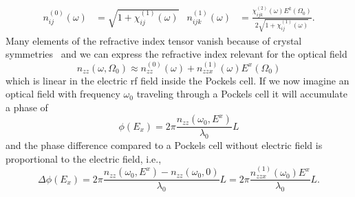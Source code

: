 \begin{align}
	n^{(0)}_{ij}(\omega)
	&=
	\sqrt{1+\chi^{(1)}_{ij}(\omega)}
	&
	n^{(1)}_{ijk}(\omega)
	&=
	\frac{\chi^{(2)}_{ijk}(\omega)
	E^k(\Omega_0)}{2\sqrt{1+\chi^{(1)}_{ij}(\omega)}}
	.
\end{align}
Many elements of the refractive index tensor vanish because of crystal symmetries~\cite[p.~237]{Yariv1984} and we can express the refractive index relevant for the optical field
\begin{equation}
	n_{zz}(\omega,\Omega_0)
	\approx
	n^{(0)}_{zz}(\omega)
	+
	n^{(1)}_{zzx}(\omega)
	E^x(\Omega_0)
\end{equation}
which is linear in the electric \gls{rf} field inside the Pockels cell.
If we now imagine an optical field with frequency $\omega_0$ traveling through a Pockels cell it will accumulate a phase of
\begin{equation}
	\phi(E_x)
	=
	2\pi\frac{n_{zz}(\omega_0,E^x)}{\lambda_0}L
\end{equation} 
and the phase difference compared to a Pockels cell without electric field is proportional to the electric field, i.e.,
\begin{equation}
	\Delta\phi(E_x)
	=
	2\pi\frac{n_{zz}(\omega_0,E^x)-n_{zz}(\omega_0,0)}{\lambda_0}L
	=
	2\pi\frac{n_{zzx}^{(1)}(\omega_0)E^x}{\lambda_0}L
	.
\end{equation}

